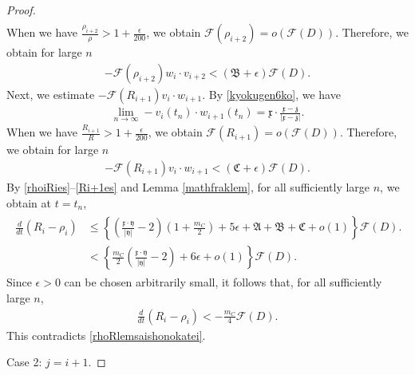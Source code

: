 \documentclass[reqno]{amsart}
\theoremstyle{plain}
\theoremstyle{definition}
\numberwithin{equation}{section}
\begin{document}
\begin{proof}
\begin{align*}
\end{align*}
When we have $\frac{\rho_{i+2}}{\rho}>1+\frac{\epsilon}{200}$, we obtain $\mathcal{F}(\rho_{i+2})=o(\mathcal{F}(D))$. 
Therefore, we obtain for large $n$
\begin{align}\label{rhoi+2es}
-\mathcal{F}(\rho_{i+2})w_i\cdot v_{i+2}<\left(\mathfrak{B}+\epsilon\right)\mathcal{F}(D).
\end{align}
Next, we estimate $-\mathcal{F}(R_{i+1})v_i\cdot w_{i+1}$. By \eqref{kyokugen6ko}, we have
\begin{align*}
\lim_{n\to\infty}-v_i(t_n)\cdot w_{i+1}(t_n)=\mathfrak{x}\cdot \frac{\mathfrak{x}-\mathfrak{z}}{|\mathfrak{x}-\mathfrak{z}|}.
\end{align*}
When we have $\frac{R_{i+1}}{R}>1+\frac{\epsilon}{200}$, we obtain $\mathcal{F}(R_{i+1})=o(\mathcal{F}(D))$. Therefore, we obtain for large $n$
\begin{align}\label{Ri+1es}
-\mathcal{F}(R_{i+1})v_i\cdot w_{i+1}<\left(\mathfrak{C}+\epsilon\right)\mathcal{F}(D).
\end{align}
By \eqref{rhoiRies}--\eqref{Ri+1es} and Lemma \ref{mathfraklem}, for all sufficiently large $n$, we obtain at $t=t_n$,
\begin{align}\label{i=jcasees}
\begin{aligned}
\frac{d}{dt}\left(R_i-\rho_i\right)&\leq \left\{\left(\frac{\mathfrak{x}\cdot \mathfrak{y}}{|\mathfrak{y}|}-2\right)\left(1+\frac{m_C}{2}\right)+5\epsilon+\mathfrak{A}+\mathfrak{B}+\mathfrak{C}+o(1)\right\} \mathcal{F}(D).
\\
&<\left\{ \frac{m_C}{2}\left(\frac{\mathfrak{x}\cdot\mathfrak{y}}{|\mathfrak{y}|}-2\right)+6\epsilon+o(1)\right\}\mathcal{F}(D).
\end{aligned}
\end{align}
Since $\epsilon>0$ can be chosen arbitrarily small, it follows that, for all sufficiently large $n$,
\begin{align*}
\frac{d}{dt}\left(R_i-\rho_i\right)
<
-\frac{m_C}{4}\mathcal{F}(D).
\end{align*}
This contradicts \eqref{rhoRlemsaishonokatei}.




Case 2: $j=i+1$.


\end{proof}
\end{document}

